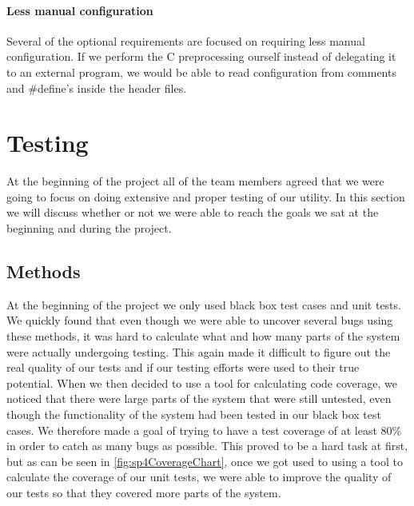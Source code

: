 \paragraph{Less manual configuration}
Several of the optional requirements are focused on requiring less manual
configuration. If we perform the C preprocessing ourself instead of delegating
it to an external program, we would be able to read configuration from
comments and \#define's inside the header files.

\section{Testing}
At the beginning of the project all of the team members agreed that we were going to focus on doing extensive and proper testing of our utility. In this section we will discuss whether or not we were able to reach the goals we sat at the beginning and during the project.

\subsection{Methods}
At the beginning of the project we only used black box test cases and unit tests. We quickly found that even though we were able to uncover several bugs using these methods, it was hard to calculate what and how many parts of the system were actually undergoing testing. This again made it difficult to figure out the real quality of our tests and if our testing efforts were used to their true potential. When we then decided to use a tool for calculating code coverage, we noticed that there were large parts of the system that were still untested, even though the functionality of the system had been tested in our black box test cases. We therefore made a goal of trying to have a test coverage of at least 80\% in order to catch as many bugs as possible. This proved to be a hard task at first, but as can be seen in \autoref{fig:sp4CoverageChart}, once we got used to using a tool to calculate the coverage of our unit tests, we were able to improve the quality of our tests so that they covered more parts of the system.

